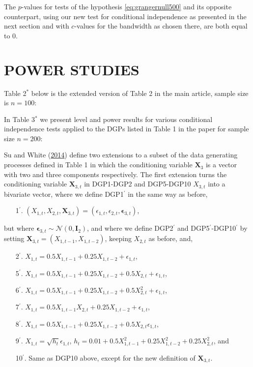 \documentclass[
  12pt,
  letterpaper]{article}
\providecommand{\tightlist}{%
  \setlength{\itemsep}{0pt}\setlength{\parskip}{0pt}}
\numberwithin{equation}{section}
\newcommand{\X}{\bm{X}}
\newcommand{\fepsilon}{\bm{\epsilon}}
\begin{document}
The \(p\)-values for tests of the hypothesis \eqref{eq:grangernull500} and its opposite counterpart, using our new test for conditional independence as presented in the next section and with \(c\)-values for the bandwidth as chosen there, are both equal to 0.

\hypertarget{power}{%
\section{POWER STUDIES}\label{power}}

Table 2\(^*\) below is the extended version of Table 2 in the main article, sample size is \(n=100\):

\vspace{1cm}



\newpage

In Table 3\(^*\) we present level and power results for various conditional independence tests applied to the DGPs listed in Table 1 in the paper for sample size \(n = 200\):



Su and White (\protect\hyperlink{ref-su2014testing}{2014}) define two extensions to a subset of the data generating processes defined in Table 1 in which the conditioning variable \(\X_3\) is a vector with two and three components respectively. The first extension turns the conditioning variable \(\X_{3,t}\) in DGP1-DGP2 and DGP5-DGP10 \(X_{3,t}\) into a bivariate vector, where we define DGP1\(^{\prime}\) in the same way as before,

\begin{itemize}
\item[1$^{\prime}$.] $(X_{1,t}, X_{2,t}, \X_{3,t}) = (\epsilon_{1,t}, \epsilon_{2,t}, \fepsilon_{3,t})$,
\end{itemize}

but where \(\fepsilon_{3,t} \sim \mathcal{N}(0, \bm{I}_2)\), and where we define DGP2\(^{\prime}\) and DGP5\(^{\prime}\)-DGP10\(^{\prime}\) by setting \(\X_{3,t} = (X_{1, t-1}, X_{1, t-2})\), keeping \(X_{2,t}\) as before, and,

\begin{itemize}
\tightlist
\item[2$^{\prime}$.] $X_{1,t} = 0.5X_{1,t-1} + 0.25X_{1, t-2} + \epsilon_{1,t}$,
\item[5$^{\prime}$.] $X_{1,t} = 0.5X_{1,t-1} + 0.25X_{1, t-2} + 0.5X_{2,t} + \epsilon_{1,t}$,
\item[6$^{\prime}$.] $X_{1,t} = 0.5X_{1,t-1} + 0.25X_{1, t-2} + 0.5X_{2,t}^2 + \epsilon_{1,t}$,
\item[7$^{\prime}$.] $X_{1,t} = 0.5X_{1,t-1}X_{2, t} + 0.25X_{1,t-2}+ \epsilon_{1,t}$,
\item[8$^{\prime}$.] $X_{1,t} = 0.5X_{1,t-1} + 0.25X_{1,t-2} + 0.5X_{2, t}\epsilon_{1,t}$,
\item[9$^{\prime}$.] $X_{1,t} = \sqrt{h_t}\epsilon_{1,t}$, $h_t = 0.01 + 0.5X_{1,t-1}^2 + 0.25X_{1,t-2}^2 + 0.25X_{2,t}^2$, and
\item[10$^{\prime}$.] Same as DGP10 above, except for the new definition of $\X_{3,t}$.
\end{itemize}
\end{document}

